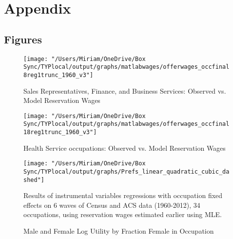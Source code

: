 \documentclass[12pt]{article}
\begin{document}
\newpage

\clearpage

\section{Appendix}


\subsection{Figures}



\begin{figure}[H]
\centering
\caption{Sales Representatives, Finance, and Business Services: Observed vs. Model Reservation Wages}
\label{sales}
\texttt{[image: "/Users/Miriam/OneDrive/Box Sync/TYPlocal/output/graphs/matlabwages/offerwages\_occfinal8reg1trunc\_1960\_v3"]}
\end{figure}

\begin{figure}[H]
\centering
\caption{Health Service occupations: Observed vs. Model Reservation Wages}
\label{health}
\texttt{[image: "/Users/Miriam/OneDrive/Box Sync/TYPlocal/output/graphs/matlabwages/offerwages\_occfinal18reg1trunc\_1960\_v3"]}
\end{figure}

\begin{figure}[H]
\caption{Male and Female Log Utility by Fraction Female in Occupation}
\label{prefs}
\begin{center}
\texttt{[image: "/Users/Miriam/OneDrive/Box Sync/TYPlocal/output/graphs/Prefs\_linear\_quadratic\_cubic\_dashed"]}
\begin{minipage}{.8\textwidth}
\begin{tablenotes}
\footnotesize
\item Results of instrumental variables regressions with occupation fixed effects on 6 waves of Census and ACS data (1960-2012), 34 occupations, using reservation wages estimated earlier using MLE.
\end{tablenotes}
\end{minipage}
\end{center}
\end{figure}
\end{document}
